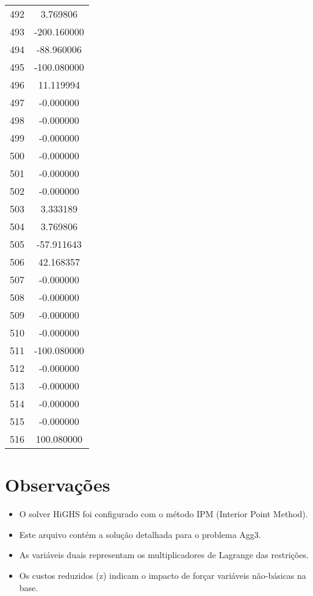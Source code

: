 \documentclass[12pt]{article}
\begin{document}
\begin{longtable}{@{}cc@{}}
492 & 3.769806 \\
493 & -200.160000 \\
494 & -88.960006 \\
495 & -100.080000 \\
496 & 11.119994 \\
497 & -0.000000 \\
498 & -0.000000 \\
499 & -0.000000 \\
500 & -0.000000 \\
501 & -0.000000 \\
502 & -0.000000 \\
503 & 3.333189 \\
504 & 3.769806 \\
505 & -57.911643 \\
506 & 42.168357 \\
507 & -0.000000 \\
508 & -0.000000 \\
509 & -0.000000 \\
510 & -0.000000 \\
511 & -100.080000 \\
512 & -0.000000 \\
513 & -0.000000 \\
514 & -0.000000 \\
515 & -0.000000 \\
516 & 100.080000 \\

\end{longtable}


\section{Observações}

\begin{itemize}
\item O solver HiGHS foi configurado com o método IPM (Interior Point Method).
\item Este arquivo contém a solução detalhada para o problema Agg3.
\item As variáveis duais representam os multiplicadores de Lagrange das restrições.
\item Os custos reduzidos (z) indicam o impacto de forçar variáveis não-básicas na base.
\end{itemize}
\end{document}
